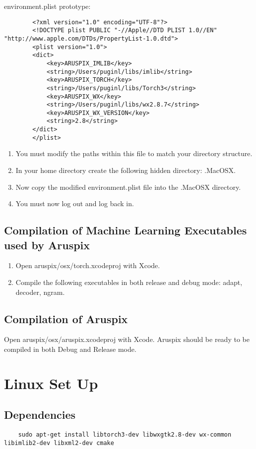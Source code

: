 \documentclass[]{article}
\begin{document}
	environment.plist prototype:
	\begin{verbatim}
		<?xml version="1.0" encoding="UTF-8"?>
		<!DOCTYPE plist PUBLIC "-//Apple//DTD PLIST 1.0//EN" "http://www.apple.com/DTDs/PropertyList-1.0.dtd">
		<plist version="1.0">
		<dict>
		    <key>ARUSPIX_IMLIB</key>
		    <string>/Users/puginl/libs/imlib</string>
		    <key>ARUSPIX_TORCH</key>
		    <string>/Users/puginl/libs/Torch3</string>
		    <key>ARUSPIX_WX</key>
		    <string>/Users/puginl/libs/wx2.8.7</string>
		    <key>ARUSPIX_WX_VERSION</key>
		    <string>2.8</string>
		</dict>
		</plist>
	\end{verbatim}
	\begin{enumerate}
		\item You must modify the paths within this file to match your directory structure.
		\item In your home directory create the following hidden directory: .MacOSX.
		\item Now copy the modified environment.plist file into the .MacOSX directory.
		\item You must now log out and log back in.
	\end{enumerate}
	
\subsection{Compilation of Machine Learning Executables used by Aruspix}
	\begin{enumerate}
		\item Open aruspix/osx/torch.xcodeproj with Xcode.
		\item Compile the following executables in both release and debug mode: adapt, decoder, ngram.
	\end{enumerate}

\subsection{Compilation of Aruspix}
Open aruspix/osx/aruspix.xcodeproj with Xcode.
Aruspix should be ready to be compiled in both Debug and Release mode. 

\section{Linux Set Up}

\subsection{Dependencies}
 \begin{verbatim}
	sudo apt-get install libtorch3-dev libwxgtk2.8-dev wx-common libimlib2-dev libxml2-dev cmake
 \end{verbatim}
\end{document}
